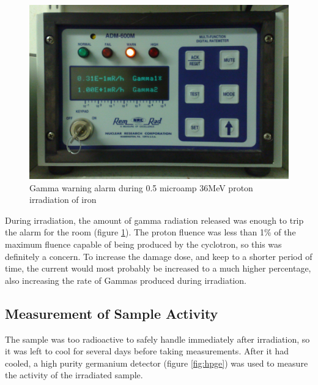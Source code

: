 \begin{figure}[htp]
  \begin{center}
    \includegraphics[scale=0.7]{chapters/activity_code/images/gamma_warning.png}
    \caption{Gamma warning alarm during 0.5 microamp 36MeV proton irradiation of iron }
    \label{fig:gammawarning}
  \end{center}
\end{figure}

During irradiation, the amount of gamma radiation released was enough to trip the alarm for the room (figure \ref{fig:gammawarning}).  The proton fluence was less than 1\% of the maximum fluence capable of being produced by the cyclotron, so this was definitely a concern.  To increase the damage dose, and keep to a shorter period of time, the current would most probably be increased to a much higher percentage, also increasing the rate of Gammas produced during irradiation.


\subsection{Measurement of Sample Activity}

The sample was too radioactive to safely handle immediately after irradiation, so it was left to cool for several days before taking measurements.  After it had cooled, a high purity germanium detector (figure \ref{fig:hpge}) was used to measure the activity of the irradiated sample.

